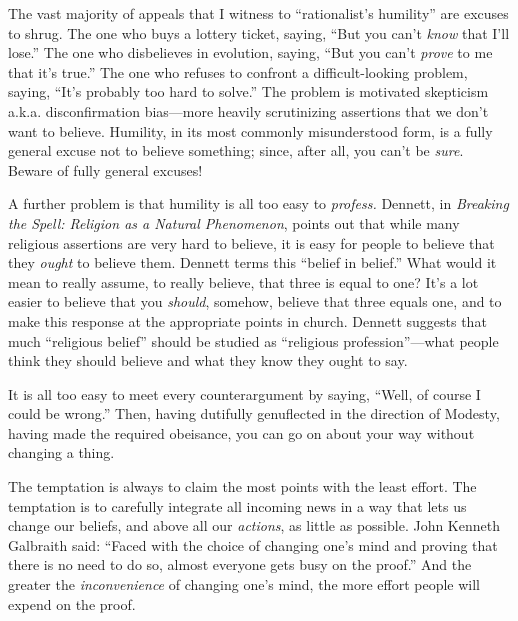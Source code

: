 {
 The vast majority of appeals that I witness to
``rationalist's
humility'' are excuses to shrug. The one who buys a
lottery ticket, saying, ``But you
can't \textit{know} that I'll
lose.'' The one who disbelieves in evolution, saying,
``But you can't \textit{prove} to me
that it's true.'' The one who refuses
to confront a difficult-looking problem, saying,
``It's probably too hard to
solve.'' The problem is motivated skepticism a.k.a.
disconfirmation bias---more heavily scrutinizing assertions that we
don't want to believe. Humility, in its most commonly
misunderstood form, is a fully general excuse not to believe something;
since, after all, you can't be \textit{sure}. Beware of
fully general excuses!}

{
 A further problem is that humility is all too easy to
\textit{profess.} Dennett, in \textit{Breaking the Spell: Religion as a
Natural Phenomenon}, points out that while many religious assertions
are very hard to believe, it is easy for people to believe that they
\textit{ought} to believe them. Dennett terms this
``belief in belief.'' What would it
mean to really assume, to really believe, that three is equal to one?
It's a lot easier to believe that you \textit{should},
somehow, believe that three equals one, and to make this response at
the appropriate points in church. Dennett suggests that much
``religious belief'' should be
studied as ``religious
profession''---what people think they should believe
and what they know they ought to say.}

{
 It is all too easy to meet every counterargument by saying,
``Well, of course I could be
wrong.'' Then, having dutifully genuflected in the
direction of Modesty, having made the required obeisance, you can go on
about your way without changing a thing.}

{
 The temptation is always to claim the most points with the least
effort. The temptation is to carefully integrate all incoming news in a
way that lets us change our beliefs, and above all our
\textit{actions}, as little as possible. John Kenneth Galbraith said:
``Faced with the choice of changing
one's mind and proving that there is no need to do so,
almost everyone gets busy on the
proof.'' And the greater the
\textit{inconvenience} of changing one's mind, the more
effort people will expend on the proof.}

